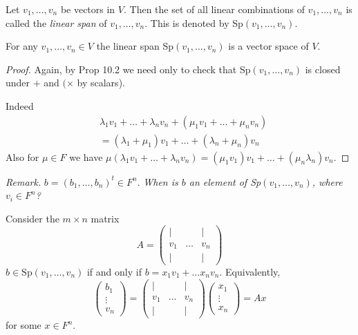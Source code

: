 \documentclass[10pt]{scrartcl}
\begin{document}
\begin{definition}
Let $v_1,\dots,v_n$ be vectors in $V$. Then the set of all linear combinations of $v_1,\dots,v_n$ is called the \emph{linear span} of $v_1,\dots,v_n$. This is denoted by Sp$(v_1,\dots,v_n)$.	
\end{definition}\vsp

\begin{proposition}
For any $v_1,\dots,v_n \in V$ the linear span Sp$(v_1,\dots,v_n)$ is a vector space of $V$. 
\end{proposition}
\begin{proof}
Again, by Prop 10.2 we need only to check that Sp$(v_1,\dots,v_n)$ is closed under $+$ and $(\times$ by scalars).	 

Indeed 
\begin{align*}
  &\lambda_1v_1 + \dots + \lambda_nv_n + (\mu_1v_1 + \dots + \mu_nv_n)\\
  &= (\lambda_1+ \mu_1)v_1  + \dots + (\lambda_n + \mu_n)v_n
\end{align*}
Also for $\mu \in F$ we have $\mu(\lambda_1v_1 + \dots + \lambda_nv_n) = (\mu_1v_1)v_1 + \dots + (\mu_n\lambda_n)v_n$.
\end{proof}

\emph{Remark.} 
$b =(b_1,\dots,b_n)^t \in F^n$. 
\emph{When is $b$ an element of Sp$(v_1,\dots,v_n)$, where $v_i \in F^n$?}

Consider the $m \times n$ matrix 
\[
  A = \begin{pmatrix}
 | & & |\\
 v_1 & \dots & v_n \\
 | && |	
 \end{pmatrix}
\]
$b \in \mathrm{Sp}(v_1,\dots,v_n)$  if and only if $b = x_1v_1 + \dots x_nv_n$. Equivalently, 
\[
  \begin{pmatrix}
 b_1 \\ \vdots \\ v_n	
 \end{pmatrix} = \begin{pmatrix}
 | & & |\\
 v_1 & \dots & v_n \\
 | && |	
 \end{pmatrix}\begin{pmatrix}
 x_1 \\ \vdots \\ x_n	
 \end{pmatrix}
 = Ax
\]
for some $x \in F^n$.\\
\end{document}
